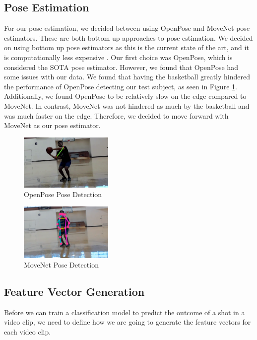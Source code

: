 \documentclass[10pt,twocolumn,letterpaper]{article}
\begin{document}
\subsection{Pose Estimation}
For our pose estimation, we decided between using OpenPose and MoveNet pose estimators. These are both bottom up approaches to pose estimation. We decided on using bottom up pose estimators as this is the
current state of the art, and it is computationally less expensive \cite{Datagen}. Our first choice was OpenPose, which is considered the SOTA pose estimator. However, we found that OpenPose had some issues 
with our data. We found that having the basketball greatly hindered the performance of OpenPose detecting our test subject, as seen in Figure \ref{fig:openpose}. Additionally, we found OpenPose to be relatively slow
on the edge compared to MoveNet. In contrast, MoveNet was not hindered as much by the basketball and was much faster on the edge. Therefore, we decided to move forward with MoveNet as our pose estimator.
\begin{figure}[h]
  \centering
  \includegraphics[width=0.40\textwidth]{imgs/openpose_bad.png}
  \caption{OpenPose Pose Detection}
  \label{fig:openpose}
\end{figure}

\begin{figure}[h]
  \centering
  \includegraphics[width=0.40\textwidth]{imgs/movenet_good.png}
  \caption{MoveNet Pose Detection}
  \label{fig:movenet}
\end{figure}

\subsection{Feature Vector Generation}
Before we can train a classification model to predict the outcome of a shot in a video clip, we need to define how
we are going to generate the feature vectors for each video clip. 
\end{document}
